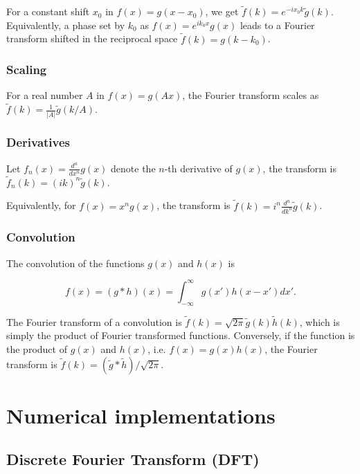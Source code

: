 For a constant shift $x_0$ in $f(x) = g(x-x_0)$, we get $\tilde{f}(k) = e^{-i x_0 k}\tilde{g}(k)$.
Equivalently, a phase set by $k_0$ as $f(x) = e^{i k_0 x} g(x)$ leads to a Fourier transform shifted in the reciprocal space $\tilde{f}(k) = g(k-k_0)$.

\subsubsection*{Scaling}

For a real number $A$ in $f(x) = g(Ax)$, the Fourier transform scales as $\tilde{f}(k) = \frac{1}{|A|}\tilde{g}(k/A)$.

\subsubsection*{Derivatives}

Let $f_n(x) = \frac{d^n}{dx^n}g(x)$ denote the $n$-th derivative of $g(x)$, the transform is $\tilde{f}_n(k) = (ik)^n\tilde{g}(k)$.

\noindent
Equivalently, for $f(x) = x^n g(x)$, the transform is $\tilde{f}(k) = i^n \frac{d^n}{dk^n}\tilde{g}(k)$.

\subsubsection*{Convolution}

The convolution of the functions $g(x)$ and $h(x)$ is

\begin{equation}
 f(x) = (g\ast h)(x) = \int_{-\infty}^{\infty}g(x')h(x-x')dx'.
\end{equation}

The Fourier transform of a convolution is $\tilde{f}(k) = \sqrt{2\pi}\tilde{g}(k)\tilde{h}(k)$, which is simply the product of Fourier transformed functions. Conversely, if the function is the product of $g(x)$ and $h(x)$, i.e. $f(x) = g(x)h(x)$, the Fourier transform is $\tilde{f}(k) = (\tilde{g}\ast\tilde{h})/\sqrt{2\pi}$.


\section{Numerical implementations}

\subsection{Discrete Fourier Transform (DFT)}

